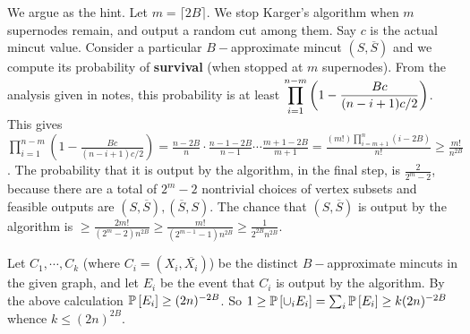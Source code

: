 We argue as the hint. Let $m = \lceil 2B\rceil$. We stop Karger's algorithm when $m$ supernodes remain, and output a random cut among them. Say $c$ is the actual mincut value. Consider a particular $B-$approximate mincut $(S,\overline S)$ and we compute its probability of \textbf{survival} (when stopped at $m$ supernodes). From the analysis given in notes, this probability is at least $\ds \prod_{i=1}^{n-m} \left(1-\frac{Bc}{(n-i+1)c/2}\right)$. This gives $ \prod\limits_{i=1}^{n-m} \left(1-\frac{Bc}{(n-i+1)c/2}\right) 
= \frac{n-2B}{n} \cdot \frac{n-1-2B}{n-1} \cdots \frac{m+1-2B}{m+1}
=\frac{(m!)\prod\limits_{i=m+1}^{n}(i-2B)}{n!} \ge \frac{m!}{n^{2B}}$. The probability that it is output by the algorithm, in the final step, is $\frac{2}{2^{m}-2}$, because there are a total of $2^{m}-2$ nontrivial choices of vertex subsets and feasible outputs are $(S,\overline S), (\overline S,S)$. The chance that $(S,\overline S)$ is output by the algorithm is $\ge \frac{2m!}{(2^{m}-2)n^{2B}} \ge \frac{m!}{(2^{m-1}-1)n^{2B}} \ge \frac{1}{2^{2B}n^{2B}}$.

Let $C_{1},\cdots,C_{k}$ (where $C_{i}=(X_{i},\overline{X_{i}})$) be the distinct $B-$approximate mincuts in the given graph, and let $E_{i}$ be the event that $C_{i}$ is output by the algorithm. By the above calculation $\P{E_{i}}\ge (2n)^{-2B}$. So $1\ge \P{\cup_{i}E_{i}} = \sum_{i}\P{E_{i}} \ge k(2n)^{-2B}$ whence $k\le (2n)^{2B}$.


